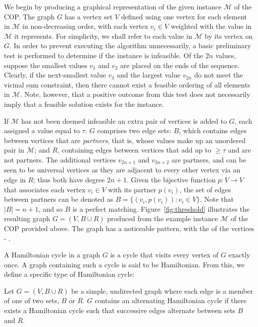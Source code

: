\documentclass{elsarticle}
\begin{document}
We begin by producing a graphical representation of the given instance $\mathcal{M}$ of the COP. The graph $G$ has a vertex set $V$ defined using one vertex for each element in $\mathcal{M}$ in non-decreasing order, with each vertex $v_i \in V$ weighted with the value in $\mathcal{M}$ it represents. For simplicity, we shall refer to each value in $\mathcal{M}$ by its vertex on $G$. In order to prevent executing the algorithm unnecessarily, a basic preliminary test is performed to determine if the instance is infeasible. Of the $2n$ values, suppose the smallest values $v_1$ and $v_2$ are placed on the ends of the sequence. Clearly, if the next-smallest value $v_3$ and the largest value $v_{2n}$ do not meet the vicinal sum constraint, then there cannot exist a feasible ordering of all elements in $\mathcal{M}$. Note, however, that a positive outcome from this test does not necessarily imply that a feasible solution exists for the instance.

If $\mathcal{M}$ has not been deemed infeasible an extra pair of vertices is added to $G$, each assigned a value equal to $\tau$. $G$ comprises two edge sets: $B$, which contains  edges between vertices that are \emph{partners}, that is, whose values make up an unordered pair in $\mathcal{M}$; and $R$, containing  edges between vertices that add up to $\geq \tau$ and are not partners. The additional vertices $v_{2n+1}$ and $v_{2n+2}$ are partners, and can be seen to be universal vertices as they are adjacent to every other vertex via an edge in $R$; thus both have degree $2n+1$. Given the bijective function $p : V \to V$ that associates each vertex $v_i \in V$ with its partner $p(v_i)$, the set of edges between partners can be denoted as $B = \{(v_i, p(v_i)) : v_i \in V\}$. Note that $|B| = n+1$, and so $B$ is a perfect matching. Figure~\ref{fig:threshold} illustrates the resulting graph $G = (V, B \cup R)$ produced from the example instance $\mathcal{M}$ of the COP provided above. The graph has a noticeable pattern, with the  of the vertices - .

A Hamiltonian cycle in a graph $G$ is a cycle that visits every vertex of $G$ exactly once. A graph containing such a cycle is said to be Hamiltonian. From this, we define a specific type of Hamiltonian cycle:

\begin{definition} %
	\label{defn:althamcycle}
	Let $G = (V, B \cup R)$ be a simple, undirected graph where each edge is a member of one of two sets, $B$ or $R$. $G$ contains an alternating Hamiltonian cycle if there exists a Hamiltonian cycle such that successive edges alternate between sets $B$ and $R$.
\end{definition}
\end{document}

